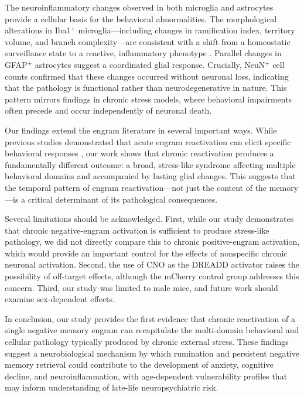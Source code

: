 \documentclass[11pt]{article}
\begin{document}
The neuroinflammatory changes observed in both microglia and astrocytes provide a cellular basis for the behavioral abnormalities. The morphological alterations in Iba1$^+$ microglia---including changes in ramification index, territory volume, and branch complexity---are consistent with a shift from a homeostatic surveillance state to a reactive, inflammatory phenotype \citep{nimmerjahn2005resting, york2021microglial}. Parallel changes in GFAP$^+$ astrocytes suggest a coordinated glial response. Crucially, NeuN$^+$ cell counts confirmed that these changes occurred without neuronal loss, indicating that the pathology is functional rather than neurodegenerative in nature. This pattern mirrors findings in chronic stress models, where behavioral impairments often precede and occur independently of neuronal death.

Our findings extend the engram literature in several important ways. While previous studies demonstrated that acute engram reactivation can elicit specific behavioral responses \citep{ramirez2013creating, redondo2014bidirectional}, our work shows that chronic reactivation produces a fundamentally different outcome: a broad, stress-like syndrome affecting multiple behavioral domains and accompanied by lasting glial changes. This suggests that the temporal pattern of engram reactivation---not just the content of the memory---is a critical determinant of its pathological consequences.

Several limitations should be acknowledged. First, while our study demonstrates that chronic negative-engram activation is sufficient to produce stress-like pathology, we did not directly compare this to chronic positive-engram activation, which would provide an important control for the effects of nonspecific chronic neuronal activation. Second, the use of CNO as the DREADD activator raises the possibility of off-target effects, although the mCherry control group addresses this concern. Third, our study was limited to male mice, and future work should examine sex-dependent effects.

In conclusion, our study provides the first evidence that chronic reactivation of a single negative memory engram can recapitulate the multi-domain behavioral and cellular pathology typically produced by chronic external stress. These findings suggest a neurobiological mechanism by which rumination and persistent negative memory retrieval could contribute to the development of anxiety, cognitive decline, and neuroinflammation, with age-dependent vulnerability profiles that may inform understanding of late-life neuropsychiatric risk.
\end{document}
